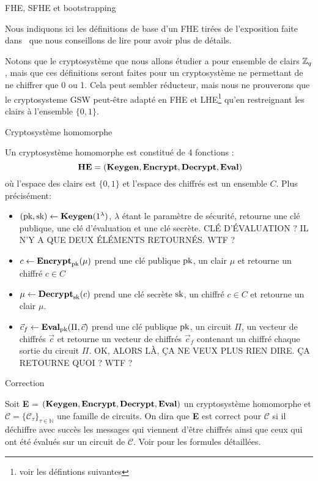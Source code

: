 \begin{section}{FHE, SFHE et bootstrapping}

Nous indiquons ici les définitions de base d'un FHE tirées de 
l'exposition faite dans~\cite{halevi} que nous conseillons 
de lire pour avoir plus de détails.

Notons que le cryptosystème que nous allons étudier a pour ensemble de clairs $\mathbb{Z}_q$, mais que ces définitions seront faites pour un cryptosystème ne permettant de ne chiffrer que 0 ou 1.
Cela peut sembler réducteur, mais nous ne prouverons que le  cryptosysteme
GSW peut-être adapté en FHE et LHE\footnote{voir les défintions suivantes} qu'en restreignant 
les clairs à l'ensemble $\{0, 1\}$.

\begin{definition}{Cryptosystème homomorphe}

Un cryptosystème homomorphe est constitué de 4 fonctions :
\[ \text{\textbf{HE}} = (\Keygen, \Enc, \Dec, \Eval)\]
où l'espace des clairs est $\{0,1\}$ et l'espace des chiffrés est un ensemble $C$.
Plus précisément:
\begin{itemize}
\item $(\text{pk}, \text{sk}) \leftarrow \text{\textbf{Keygen}}(1^\lambda)$, $\lambda$ étant le paramètre de sécurité, retourne une clé publique, une clé d'évaluation et une clé secrète.
CLÉ D'ÉVALUATION ? IL N'Y A QUE DEUX ÉLÉMENTS RETOURNÉS. WTF ?
\item $c \leftarrow \text{\textbf{Encrypt}}_{\text{pk}}(\mu)$ prend une clé publique $\text{pk}$, un clair $\mu$ et retourne un chiffré $c\in C$
\item $\mu \leftarrow \text{\textbf{Decrypt}}_{\text{sk}}(c)$ prend une clé secrète $\text{sk}$, un chiffré $c \in C$ et retourne un clair $\mu$.
\item $\vec{c}_f \leftarrow \text{\textbf{Eval}}_{\text{pk}}(\Pi,\vec{c})$ prend une clé publique
$\text{pk}$, un circuit  $\Pi$, un vecteur de chiffrés $\vec{c}$ et retourne un
vecteur de chiffrés $\vec{c}_f$ contenant un chiffré chaque sortie du circuit $\Pi$.
OK, ALORS LÀ, ÇA NE VEUX PLUS RIEN DIRE. ÇA RETOURNE QUOI ? WTF ?
\end{itemize}
\end{definition}

\begin{definition}{Correction}

Soit \textbf{E} = $(\text{\textbf{Keygen}}, \text{\textbf{Encrypt}}, \text{\textbf{Decrypt}}, \text{\textbf{Eval}})$ un cryptosystème homomorphe
et  $\mathcal{C} = \{ \mathcal{C}_\tau\}_{\tau \in \mathbb{N}}$ une famille de
circuits.  On dira que \textbf{E} est correct pour $\mathcal{C}$ si il déchiffre avec succès les messages qui viennent d'être chiffrés 
ainsi que ceux qui ont été évalués sur un circuit de $\mathcal{C}$. Voir \cite{halevi} pour les
formules détaillées.
\end{definition}


\end{section}
